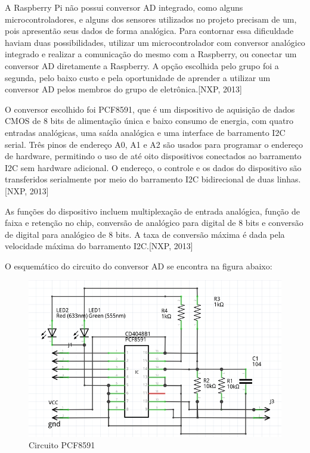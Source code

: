 A Raspberry Pi não possui conversor AD integrado, como alguns microcontroladores, e alguns dos sensores utilizados no projeto precisam de um, pois apresentão seus dados de forma analógica. Para contornar essa dificuldade haviam duas possibilidades, utilizar um microcontrolador com conversor analógico integrado e realizar a comunicação do mesmo com a Raspberry, ou conectar um conversor AD diretamente a Raspberry. A opção escolhida pelo grupo foi a segunda, pelo baixo custo e pela oportunidade de aprender a utilizar um conversor AD pelos membros do grupo de eletrônica.[NXP, 2013]

O conversor escolhido foi PCF8591, que é um dispositivo de aquisição de dados CMOS de 8 bits de alimentação única e baixo consumo de energia, com quatro entradas analógicas, uma saída analógica e uma interface de barramento I2C serial. Três pinos de endereço A0, A1 e A2 são usados para programar o endereço de hardware, permitindo o uso de até oito dispositivos conectados ao barramento I2C sem hardware adicional. O endereço, o controle e os dados do dispositivo são transferidos serialmente por meio do barramento I2C bidirecional de duas linhas.[NXP, 2013]

As funções do dispositivo incluem multiplexação de entrada analógica, função de faixa e retenção no chip, conversão de analógico para digital de 8 bits e conversão de digital para analógico de 8 bits. A taxa de conversão máxima é dada pela velocidade máxima do barramento I2C.[NXP, 2013]

O esquemático do circuito do conversor AD se encontra na figura abaixo:

\begin{figure}[H]
	\centering
	\includegraphics[width=12cm]{figuras/circuito_1.png}
	\caption{Circuito PCF8591} \label{circuito_1}
\end{figure}

